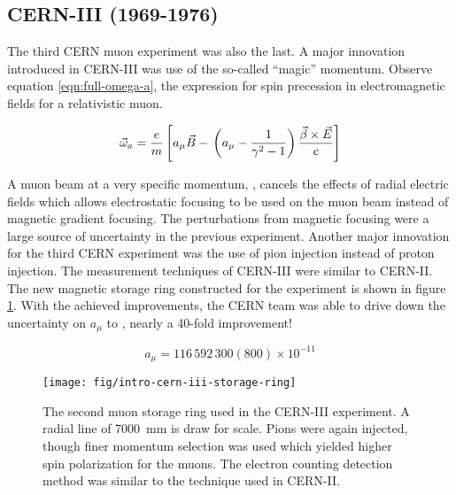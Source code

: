 \subsection{CERN-III (1969-1976)}
The third CERN muon \gmtwo experiment was also the last.  A major innovation introduced in CERN-III was use of the so-called ``magic'' momentum. Observe equation \ref{eqn:full-omega-a}, the expression for spin precession in electromagnetic fields for a relativistic muon.

\begin{equation}
\label{eqn:full-omega-a}
\vec{\omega}_a = \frac{e}{m} \left[ a_\mu \vec{B} - \\
\left(a_\mu - \frac{1}{\gamma^2 - 1} \right) \\
\frac{\vec{\beta} \times \vec{E}}{c} \right]
\end{equation}

\noindent A muon beam at a very specific momentum, \pmagic, cancels the effects of radial electric fields which allows electrostatic focusing to be used on the muon beam instead of magnetic gradient focusing.  The perturbations from magnetic focusing were a large source of uncertainty in the previous experiment.  Another major innovation for the third CERN experiment was the use of pion injection instead of proton injection.  The measurement techniques of CERN-III were similar to CERN-II.  The new magnetic storage ring constructed for the experiment is shown in figure \ref{fig:intro-cern-iii-storage-ring}.  With the achieved improvements, the CERN team was able to drive down the uncertainty on $a_\mu$ to  \cite{47y-muon-g-2}, nearly a 40-fold improvement!

\begin{equation}
\label{eqn:cern-iii-results}
a_\mu = 116\,592\,300 (800) \times 10^{-11}
\end{equation}

\begin{figure}
\centering
\texttt{[image: fig/intro-cern-iii-storage-ring]}
\caption{
    The second muon storage ring used in the CERN-III experiment.  A radial line of \SI{7000}{\mm} is draw for scale.  Pions were again injected, though finer momentum selection was used which yielded higher spin polarization for the muons.  The electron counting detection method was similar to the technique used in CERN-II.
    \label{fig:intro-cern-iii-storage-ring}    
}
\end{figure}

